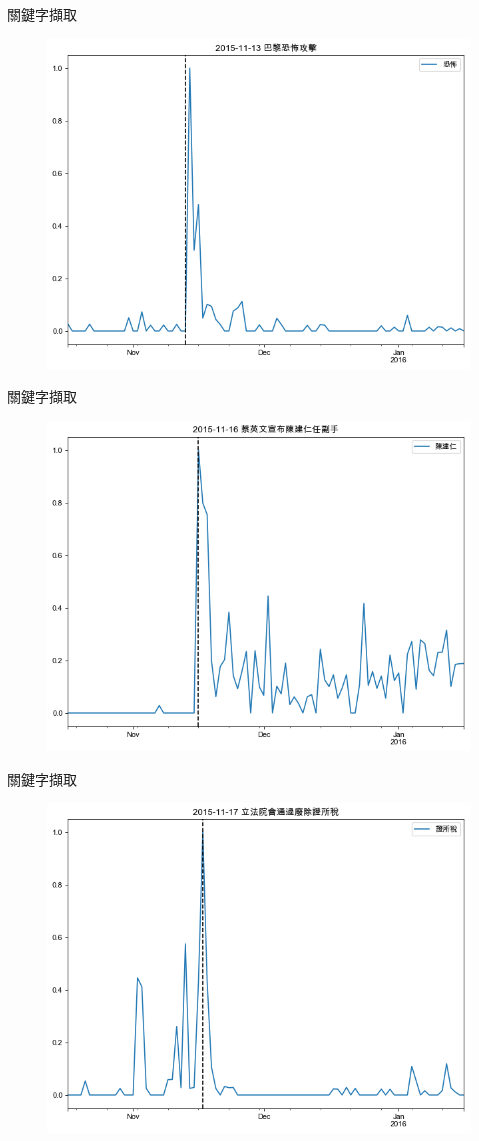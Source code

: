 \documentclass{beamer}
\begin{document}
\begin{CJK}{UTF8}{bkai}
\begin{frame}{關鍵字擷取}
\begin{figure}
  \includegraphics[width=.7\textwidth, height=.7\textheight, keepaspectratio]{ts02}
\end{figure}
\end{frame}

\begin{frame}{關鍵字擷取}
\begin{figure}
  \includegraphics[width=.7\textwidth, height=.7\textheight, keepaspectratio]{ts03}
\end{figure}
\end{frame}

\begin{frame}{關鍵字擷取}
\begin{figure}
  \includegraphics[width=.7\textwidth, height=.7\textheight, keepaspectratio]{ts04}
\end{figure}
\end{frame}


\end{CJK}
\end{document}
